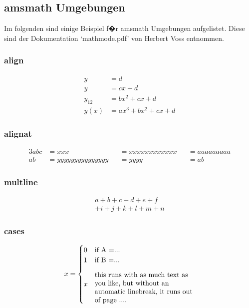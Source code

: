 \subsection{amsmath Umgebungen}

Im folgenden sind einige Beispiel f�r amsmath Umgebungen aufgelistet. Diese sind der Dokumentation `mathmode.pdf' von Herbert Voss entnommen.

\subsubsection{align}
\begin{align}
y      & = d\\
y      & = cx + d\\
y_{12} & = bx^{2} + cx + d\\
y(x)   & = ax^{3} + bx^{2}+ cx + d
\end{align}

\subsubsection{alignat}
\begin{alignat}{3}
abc   &= xxx &&= xxxxxxxxxxxx &&= aaaaaaaaa \\
ab    &= yyyyyyyyyyyyyyy &&= yyyy &&= ab
\end{alignat}

\subsubsection{multline}

\begin{multline}
a+b+c+d+e+f\\
+i+j+k+l+m+n
\end{multline}

\subsubsection{cases}
\begin{equation}
x = \begin{cases}
   0 & \text{if A =...}\\
   1 & \text{if B =...}\\
   x & \parbox{5 cm}{%
\flushleft %
this runs with as much text as you like,
but without an automatic linebreak,
it runs out of page ....} %
\end{cases}
\end{equation}

